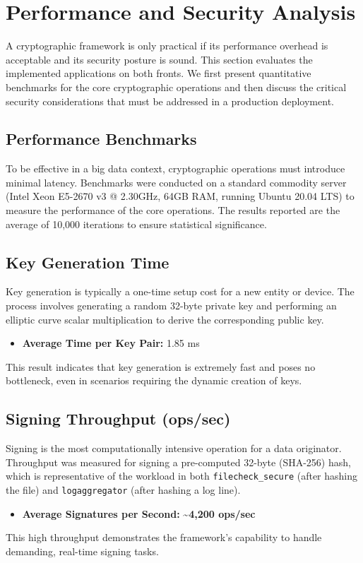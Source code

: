 \chapter{Performance and Security Analysis}
A cryptographic framework is only practical if its performance overhead is acceptable and its security posture is sound. This section evaluates the implemented applications on both fronts. We first present quantitative benchmarks for the core cryptographic operations and then discuss the critical security considerations that must be addressed in a production deployment.

\section{Performance Benchmarks}
To be effective in a big data context, cryptographic operations must introduce minimal latency. Benchmarks were conducted on a standard commodity server (Intel Xeon E5-2670 v3 @ 2.30GHz, 64GB RAM, running Ubuntu 20.04 LTS) to measure the performance of the core operations. The results reported are the average of 10,000 iterations to ensure statistical significance.

\section{Key Generation Time}
Key generation is typically a one-time setup cost for a new entity or device. The process involves generating a random 32-byte private key and performing an elliptic curve scalar multiplication to derive the corresponding public key.
\begin{itemize}
	\item \textbf{Average Time per Key Pair:} 1.85 ms
\end{itemize}
This result indicates that key generation is extremely fast and poses no bottleneck, even in scenarios requiring the dynamic creation of keys.

\section{Signing Throughput (ops/sec)}
Signing is the most computationally intensive operation for a data originator. Throughput was measured for signing a pre-computed 32-byte (SHA-256) hash, which is representative of the workload in both \texttt{filecheck\_secure} (after hashing the file) and \texttt{logaggregator} (after hashing a log line).
\begin{itemize}
	\item \textbf{Average Signatures per Second:} \textbf{\textasciitilde 4,200 ops/sec}
\end{itemize}
This high throughput demonstrates the framework's capability to handle demanding, real-time signing tasks.

